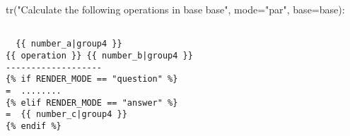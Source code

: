 {{ tr("Calculate  the following operations in base {base}", mode="par", base=base)}}:

\begin{verbatim}

  {{ number_a|group4 }}
{{ operation }} {{ number_b|group4 }}
-------------------
{% if RENDER_MODE == "question" %}
=  ........
{% elif RENDER_MODE == "answer" %}
=  {{ number_c|group4 }}
{% endif %}

\end{verbatim}

